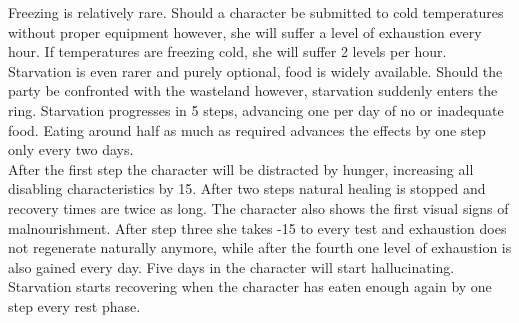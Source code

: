 \documentclass[12pt,a4paper,openany]{book}
\begin{document}
	Freezing is relatively rare. Should a character be submitted to cold temperatures without proper equipment however, she will suffer a level of exhaustion every hour. If temperatures are freezing cold, she will suffer 2 levels per hour.\\
	Starvation is even rarer and purely optional, food is widely available. Should the party be confronted with the wasteland however, starvation suddenly enters the ring. Starvation progresses in 5 steps, advancing one per day of no or inadequate food. Eating around half as much as required advances the effects by one step only every two days.\\
	After the first step the character will be distracted by hunger, increasing all disabling characteristics by 15. After two steps natural healing is stopped and recovery times are twice as long. The character also shows the first visual signs of malnourishment. After step three she takes -15 to every test and exhaustion does not regenerate naturally anymore, while after the fourth one level of exhaustion is also gained every day. Five days in the character will start hallucinating.\\
	Starvation starts recovering when the character has eaten enough again by one step every rest phase.
\end{document}
